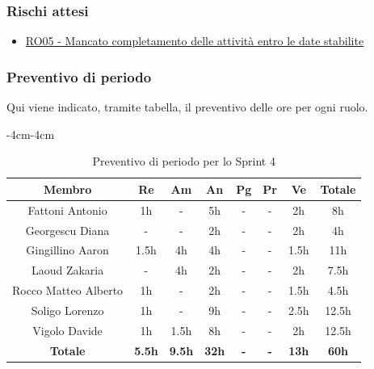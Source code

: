 \documentclass[a4paper,12pt]{article}
\begin{document}
\subsubsection{Rischi attesi}
\begin{itemize}
    \item \hyperref[RO05]{RO05 - Mancato completamento delle attività entro le date stabilite}
\end{itemize}

\subsubsection{Preventivo di periodo}
Qui viene indicato, tramite tabella, il preventivo delle ore per ogni ruolo.
\begin{table}[H]
    \begin{adjustwidth}{-4cm}{-4cm}
    \centering
    \begin{tabular}{|c|c|c|c|c|c|c|c|}
        \hline
        \textbf{Membro}& \textbf{Re} & \textbf{Am} & \textbf{An} & \textbf{Pg} & \textbf{Pr} & \textbf{Ve} & \textbf{Totale} \\
        \hline
        Fattoni Antonio & 1h & - & 5h & - & - & 2h & 8h \\
        \hline
        Georgescu Diana& - & - & 2h & - & - & 2h & 4h \\
        \hline
        Gingillino Aaron& 1.5h & 4h & 4h & - & - & 1.5h & 11h \\
        \hline
        Laoud Zakaria& - & 4h & 2h & - & - & 2h & 7.5h \\
        \hline
        Rocco Matteo Alberto & 1h & - & 2h & - & - & 1.5h & 4.5h \\
        \hline
        Soligo Lorenzo& 1h & - & 9h & - & - & 2.5h & 12.5h \\
        \hline
        Vigolo Davide & 1h & 1.5h & 8h & - & - & 2h & 12.5h \\
        \hline
        \textbf{Totale} & \textbf{5.5h} & \textbf{9.5h} & \textbf{32h} & \textbf{-} & \textbf{-} & \textbf{13h} & \textbf{60h} \\
        \hline
    \end{tabular}
    \caption{Preventivo di periodo per lo Sprint 4}
    \end{adjustwidth}
\end{table}
\end{document}
